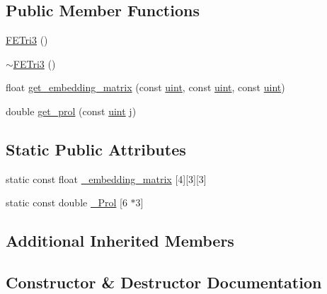 \subsection*{Public Member Functions}
\begin{DoxyCompactItemize}
\item 
\mbox{\hyperlink{classfemus_1_1_f_e_tri3_a4d490c268e682f84847935114d71201f}{F\+E\+Tri3}} ()
\item 
\mbox{\hyperlink{classfemus_1_1_f_e_tri3_a140b1aabebf8a03b3131cec1e9d83bd2}{$\sim$\+F\+E\+Tri3}} ()
\item 
float \mbox{\hyperlink{classfemus_1_1_f_e_tri3_ad9dd0717627d89b61a2536d9da42f17e}{get\+\_\+embedding\+\_\+matrix}} (const \mbox{\hyperlink{_typedefs_8hpp_a91ad9478d81a7aaf2593e8d9c3d06a14}{uint}}, const \mbox{\hyperlink{_typedefs_8hpp_a91ad9478d81a7aaf2593e8d9c3d06a14}{uint}}, const \mbox{\hyperlink{_typedefs_8hpp_a91ad9478d81a7aaf2593e8d9c3d06a14}{uint}})
\item 
double \mbox{\hyperlink{classfemus_1_1_f_e_tri3_aa7d2dc636ad0e4b18782beac8bd927ef}{get\+\_\+prol}} (const \mbox{\hyperlink{_typedefs_8hpp_a91ad9478d81a7aaf2593e8d9c3d06a14}{uint}} j)
\end{DoxyCompactItemize}
\subsection*{Static Public Attributes}
\begin{DoxyCompactItemize}
\item 
static const float \mbox{\hyperlink{classfemus_1_1_f_e_tri3_a1fc74a520e21afe5e54e380a5a880734}{\+\_\+embedding\+\_\+matrix}} \mbox{[}4\mbox{]}\mbox{[}3\mbox{]}\mbox{[}3\mbox{]}
\item 
static const double \mbox{\hyperlink{classfemus_1_1_f_e_tri3_aef865243ebec6c1da8594e2e74da72e0}{\+\_\+\+Prol}} \mbox{[}6 $\ast$3\mbox{]}
\end{DoxyCompactItemize}
\subsection*{Additional Inherited Members}


\subsection{Constructor \& Destructor Documentation}
\mbox{\label{classfemus_1_1_f_e_tri3_a4d490c268e682f84847935114d71201f}} 
